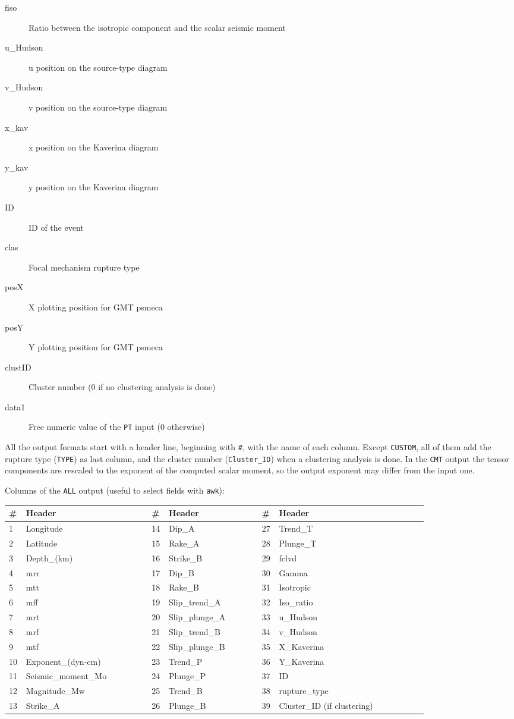 \documentclass[11pt,a4paper,english]{article}
\numberwithin{equation}{section}
\begin{document}
\begin{description}
\begin{description}
\item[fiso] Ratio between the isotropic component and the scalar seismic moment
\item[u\_Hudson] u position on the source-type diagram
\item[v\_Hudson] v position on the source-type diagram
\item[x\_kav] x position on the Kaverina diagram
\item[y\_kav] y position on the Kaverina diagram
\item[ID] ID of the event
\item[clas] Focal mechanism rupture type
\item[posX] X plotting position for GMT psmeca
\item[posY] Y plotting position for GMT psmeca
\item[clustID] Cluster number (0 if no clustering analysis is done)
\item[data1] Free numeric value of the \texttt{PT} input (0 otherwise)
\end{description}
\end{description}
All the output formats start with a header line, beginning with \texttt{\#}, with the name of each column. Except \texttt{CUSTOM}, all of them add the rupture type (\texttt{TYPE}) as last column, and the cluster number (\texttt{Cluster\_ID}) when a clustering analysis is done. In the \texttt{CMT} output the tensor components are rescaled to the exponent of the computed scalar moment, so the output exponent may differ from the input one.

Columns of the \texttt{ALL} output (useful to select fields with \texttt{awk}):
{\tiny
\begin{longtable}
{p{0.01\linewidth}p{0.27\linewidth}p{0.01\linewidth}p{0.2\linewidth}p{0.01\linewidth}p{0.32\linewidth}}
\toprule
\textbf{\#} & \textbf{Header} & \textbf{\#} & \textbf{Header} & \textbf{\#} & \textbf{Header} \\
\midrule
\endhead
1 & Longitude & 14 & Dip\_A & 27 & Trend\_T \\
2 & Latitude & 15 & Rake\_A & 28 & Plunge\_T \\
3 & Depth\_(km) & 16 & Strike\_B & 29 & fclvd \\
4 & mrr & 17 & Dip\_B & 30 & Gamma \\
5 & mtt & 18 & Rake\_B & 31 & Isotropic \\
6 & mff & 19 & Slip\_trend\_A & 32 & Iso\_ratio \\
7 & mrt & 20 & Slip\_plunge\_A & 33 & u\_Hudson \\
8 & mrf & 21 & Slip\_trend\_B & 34 & v\_Hudson \\
9 & mtf & 22 & Slip\_plunge\_B & 35 & X\_Kaverina \\
10 & Exponent\_(dyn-cm) & 23 & Trend\_P & 36 & Y\_Kaverina \\
11 & Seismic\_moment\_Mo & 24 & Plunge\_P & 37 & ID \\
12 & Magnitude\_Mw & 25 & Trend\_B & 38 & rupture\_type \\
13 & Strike\_A & 26 & Plunge\_B & 39 & Cluster\_ID (if clustering) \\
\bottomrule
\end{longtable}
}
\end{document}
